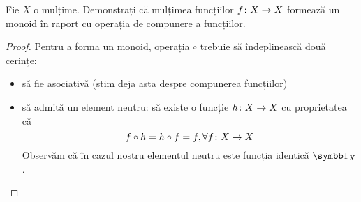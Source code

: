 \begin{exercise}
Fie \(X\) o mulțime. Demonstrați că mulțimea funcțiilor \(f \colon X \to X\) formează un monoid în raport cu operația de compunere a funcțiilor.
\end{exercise}
\begin{proof}
Pentru a forma un monoid, operația \(\circ\) trebuie să îndeplinească două cerințe:
\begin{itemize}
    \item să fie asociativă (știm deja asta despre \href{https://en.wikipedia.org/wiki/Function_composition#Properties}{compunerea funcțiilor})
    \item să admită un element neutru: să existe o funcție \(h \colon X \to X\) cu proprietatea că
    \[
        f \circ h = h \circ f = f, \forall f \colon X \to X
    \]
    Observăm că în cazul nostru elementul neutru este funcția identică \(\identity{X}\).
\end{itemize}
\end{proof}
